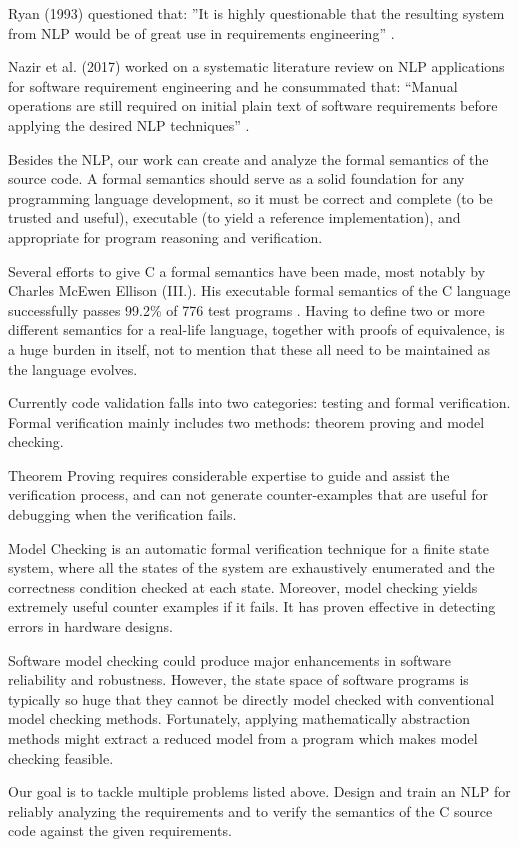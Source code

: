 \begin{multicols}{2}
	Ryan (1993) questioned that: ”It is highly questionable that the resulting system from \gls{NLP} would be of great use in requirements engineering” \cite{Ryan}.
	
	Nazir et al. (2017) worked on a systematic literature review on \gls{NLP} applications for software requirement engineering and he consummated that: “Manual operations are still required on initial plain text of software requirements before applying the desired \gls{NLP} techniques” \cite{Nazir}.
	
	Besides the \gls{NLP}, our work can create and analyze the formal semantics of the source code.  A formal semantics should serve as a solid foundation for any programming language development, so it must be correct and complete (to be trusted and useful), executable (to yield a reference implementation), and appropriate for program reasoning and verification.
	
	Several efforts to give C a formal semantics have been made, most notably by Charles McEwen Ellison (III.). His executable formal semantics of the C language successfully passes  99.2\% of 776 test programs \cite{Ellison:2012:EFS:2103621.2103719}. Having to define two or more different semantics for a real-life language, together with proofs of equivalence, is a huge burden in itself, not to mention that these all need to be maintained as the language evolves.
	
	Currently code validation falls into two categories: testing and formal verification. Formal verification mainly includes two methods: theorem proving and model checking.
	
	Theorem Proving requires considerable expertise to guide and assist the verification process, and can not generate counter-examples that are useful for debugging when the verification fails.
	
	Model Checking \cite{Clarke:2000:MC:332656} is an automatic formal verification technique for a finite state system, where all the states of the system are exhaustively enumerated and the correctness condition checked at each state. Moreover, model checking yields extremely useful counter examples if it fails. It has proven effective in detecting errors in hardware designs.
	
	Software model checking could produce major enhancements in software reliability and robustness. However, the state space of software programs is typically so huge that they cannot be directly model checked with conventional model checking methods. Fortunately, applying mathematically abstraction methods might extract a reduced model from a program which makes model checking feasible.
	
	Our goal is to tackle multiple problems listed above. Design and train an \gls{NLP} for reliably analyzing the requirements and to verify the semantics of the C source code against the given requirements.
	
\end{multicols}

